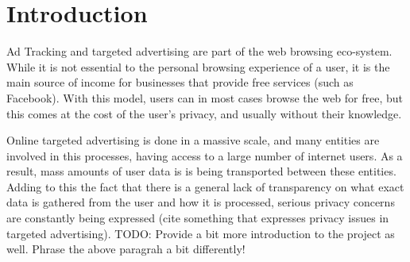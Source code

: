 \documentclass{l4proj}
\begin{document}
%
%
%
%
%
%
%
%
\chapter{Introduction}


Ad Tracking and targeted advertising are part of the web browsing eco-system. While it is not essential to the personal browsing experience of a user, it is the main source of income for businesses that provide free services (such as Facebook). With this model, users can in most cases browse the web for free, but this comes at the cost of the user's privacy, and usually without their knowledge. 

Online targeted advertising is done in a massive scale, and many entities are involved in this processes, having access to a large number of internet users. As a result, mass amounts of user data is is being transported between these entities. Adding to this the fact that there is a general lack of transparency on what exact data is gathered from the user and how it is processed, serious privacy concerns are constantly being expressed (cite something that expresses privacy issues in targeted advertising).
TODO: Provide a bit more introduction to the project as well. Phrase the above paragrah a bit differently!
\end{document}
